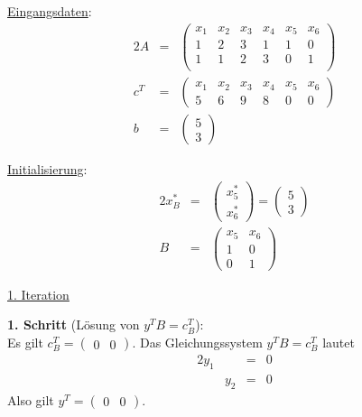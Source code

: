 \documentclass[10pt,a4paper,oneside,ngerman,numbers=noenddot]{scrartcl}
\begin{document}
		\underline{Eingangsdaten}:
		\begin{alignat*}{2}
			A &=& \begin{pmatrix}
				x_{1} & x_{2} & x_{3} & x_{4} & x_{5} & x_{6} \\
				1 & 2 & 3 & 1 & 1 & 0 \\
				1 & 1 & 2 & 3 & 0 & 1\\
			\end{pmatrix} \\
			c^{T} &=& \begin{pmatrix}
				x_{1} & x_{2} & x_{3} & x_{4} & x_{5} & x_{6} \\
				5 & 6 & 9 & 8 & 0 & 0
			\end{pmatrix} \\
			b &=& \begin{pmatrix}
				5 \\
				3
			\end{pmatrix}
		\end{alignat*}

		\underline{Initialisierung}:
		\begin{alignat*}{2}
			x_{B}^{*} &=& \begin{pmatrix}
				x_{5}^{*} \\
				x_{6}^{*}
			\end{pmatrix}
			=
			\begin{pmatrix}
				5 \\
				3
			\end{pmatrix} \\
			B &=& \begin{pmatrix}
				x_{5} & x_{6} \\
				1 & 0 \\
				0 & 1
			\end{pmatrix}
		\end{alignat*}
		
		\underline{1. Iteration}
		
		\textbf{1. Schritt} (Lösung von $y^{T}B = c_{B}^{T}$):\\
		Es gilt $c_{B}^{T} = \begin{pmatrix} 0 & 0 \end{pmatrix}$. Das Gleichungssystem $y^{T}B = c_{B}^{T}$ lautet
		\begin{alignat*}{2}
			y_{1} & &=& 0 \\
			& y_{2} &=& 0
		\end{alignat*}
		Also gilt $y^{T} = \begin{pmatrix} 0 & 0 \end{pmatrix}$.
		
\end{document}
